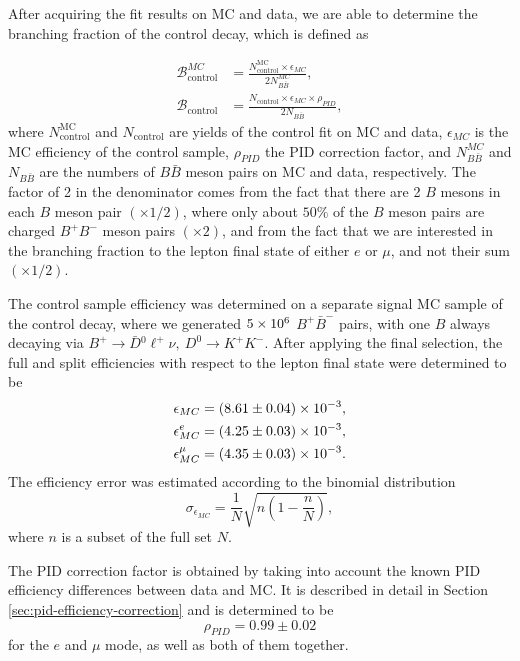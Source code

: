 After acquiring the fit results on MC and data, we are able to determine the branching fraction of the control decay, which is defined as

\begin{align}
\mathcal{B}^{MC}_{\mathrm{control}} &= \frac{N^{\mathrm{MC}}_\mathrm{control} \times \epsilon_{MC}}{2N_{B\bar B}^{MC}},\\
\mathcal{B}_{\mathrm{control}} &= \frac{N_\mathrm{control} \times \epsilon_{MC} \times \rho_{PID}}{2N_{B\bar B}},
\label{eq:br_data}
\end{align}
where $N^{\mathrm{MC}}_\mathrm{control}$ and $N_\mathrm{control}$ are yields of the control fit on MC and data, $\epsilon_{MC}$ is the MC efficiency of the control sample, $\rho_{PID}$ the PID correction factor, and $N_{B\bar B}^{MC}$ and $N_{B\bar B}$ are the numbers of $B \bar B$ meson pairs on MC and data, respectively. The factor of 2 in the denominator comes from the fact that there are 2 $B$ mesons in each $B$ meson pair $(\times 1/2)$, where only about $50\%$ of the $B$ meson pairs are charged $B^+B^-$ meson pairs $(\times 2)$, and from the fact that we are interested in the branching fraction to the lepton final state of either $e$ or $\mu$, and not their sum $(\times 1/2)$.

The control sample efficiency was determined on a separate signal MC sample of the control decay, where we generated $5\times 10^{6}$ $B^+ \bar B^-$ pairs, with one $B$ always decaying via $B^+ \to \bar D {}^0 \ell^+ \nu,~D^0 \to K^+K^-$. After applying the final selection, the full and split efficiencies with respect to the lepton final state were determined to be 
\begin{align*}
\epsilon_{MC} &= (8.61\pm 0.04)\times 10^{-3},\\
\epsilon_{MC}^e &= (4.25\pm 0.03)\times 10^{-3},\\
\epsilon_{MC}^\mu &= (4.35\pm 0.03)\times 10^{-3}.
\end{align*}
The efficiency error was estimated according to the binomial distribution
\begin{equation*}
\sigma_{\epsilon_{MC}} = \frac{1}{N}\sqrt{n(1-\frac{n}{N})},
\end{equation*}
where $n$ is a subset of the full set $N$.

The PID correction factor is obtained by taking into account the known PID efficiency differences between data and MC. It is described in detail in Section \ref{sec:pid-efficiency-correction} and is determined to be
\begin{equation*}
\rho_{PID} = 0.99\pm 0.02
\end{equation*}
for the $e$ and $\mu$ mode, as well as both of them together.

